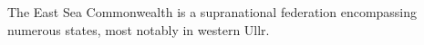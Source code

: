 

	The East Sea Commonwealth is a supranational federation encompassing numerous states, most notably in western Ullr.